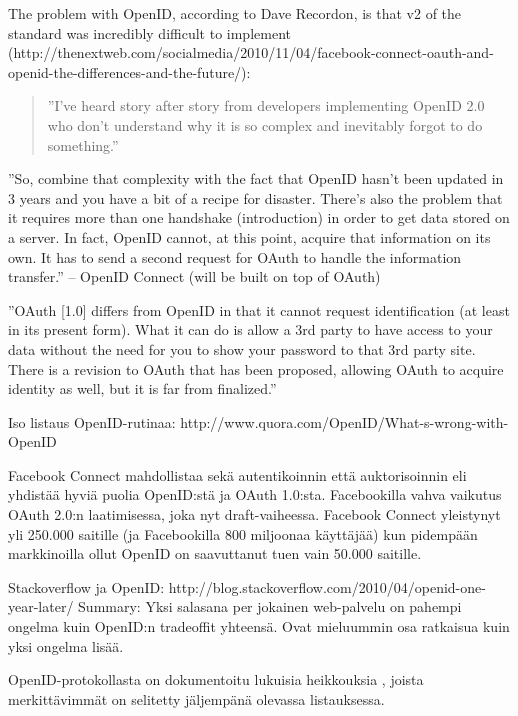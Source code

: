 \documentclass[english,gradu]{tktltiki}
\begin{document}
The problem with OpenID, according to Dave Recordon, is that v2 of the standard was incredibly difficult to implement (http://thenextweb.com/socialmedia/2010/11/04/facebook-connect-oauth-and-openid-the-differences-and-the-future/):
\begin{quote}
  ''I’ve heard story after story from developers implementing OpenID 2.0 who don’t understand why it is so complex and inevitably forgot to do something.''
\end{quote}

''So, combine that complexity with the fact that OpenID hasn’t been updated in 3 years and you have a bit of a recipe for disaster. There’s also the problem that it requires more than one handshake (introduction) in order to get data stored on a server. In fact, OpenID cannot, at this point, acquire that information on its own. It has to send a second request for OAuth to handle the information transfer.'' -- OpenID Connect (will be built on top of OAuth)

''OAuth [1.0] differs from OpenID in that it cannot request identification (at least in its present form). What it can do is allow a 3rd party to have access to your data without the need for you to show your password to that 3rd party site. There is a revision to OAuth that has been proposed, allowing OAuth to acquire identity as well, but it is far from finalized.''

Iso listaus OpenID-rutinaa: http://www.quora.com/OpenID/What-s-wrong-with-OpenID

Facebook Connect mahdollistaa sekä autentikoinnin että auktorisoinnin eli yhdistää hyviä puolia OpenID:stä ja OAuth 1.0:sta. Facebookilla vahva vaikutus OAuth 2.0:n laatimisessa, joka nyt draft-vaiheessa. Facebook Connect yleistynyt yli 250.000 saitille (ja Facebookilla 800 miljoonaa käyttäjää) kun pidempään markkinoilla ollut OpenID on saavuttanut tuen vain 50.000 saitille.


Stackoverflow ja OpenID: http://blog.stackoverflow.com/2010/04/openid-one-year-later/
Summary: Yksi salasana per jokainen web-palvelu on pahempi ongelma kuin OpenID:n tradeoffit yhteensä. Ovat mieluummin osa ratkaisua kuin yksi ongelma lisää.


OpenID-protokollasta on dokumentoitu lukuisia heikkouksia \cite{blackhat_openid_security_story, cameron_infocard_07, three_types_of_openid_ids_10}, joista merkittävimmät on selitetty jäljempänä olevassa listauksessa.
\end{document}
